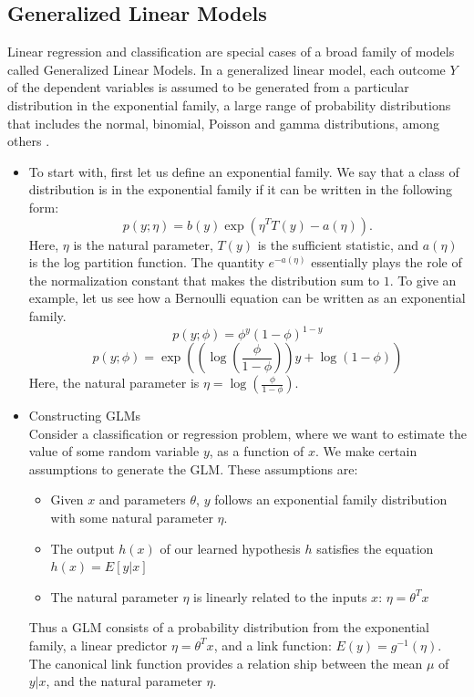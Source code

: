 \documentclass[twoside]{article}
\begin{document}
\subsection{Generalized Linear Models}
Linear regression and classification  are special cases of a broad family of models called Generalized Linear Models. In a generalized linear model, each outcome $Y$ of the dependent variables is assumed to be generated from a particular distribution in the exponential family, a large range of probability distributions that includes the normal, binomial, Poisson and gamma distributions, among others \cite{10.2307/2344614}.

\begin{itemize}
\item To start with, first let us define an exponential family. We say that a class of distribution is in the exponential family if it can be written in the following form:
\[p(y;\eta) = b(y) \exp(\eta^T T(y) - a(\eta)).\]
Here, $\eta$ is the natural parameter, $T(y)$ is the sufficient statistic, and $a(\eta)$ is the log partition function. The quantity $e^{-a(\eta)}$ essentially plays the role of the normalization constant that makes the distribution sum to $1$. To give an example, let us see how a Bernoulli equation can be written as an exponential family.
\[ p(y;\phi)  = \phi^y(1-\phi)^{1-y}\]
\[p(y;\phi)  = \exp \left(\left(\log \left(\frac{\phi}{1-\phi}\right)\right)y + \log(1-\phi) \right) \]
Here, the natural parameter is $\eta = \log \left(\frac{\phi}{1-\phi}\right)$.

\item Constructing GLMs \\
Consider a classification or regression problem, where we want to estimate the value of some random variable $y$, as a function of $x$. We make certain assumptions to generate the GLM. These assumptions are:
\begin{itemize}
\item  Given $x$ and parameters $\theta$, $y$ follows an exponential family distribution with some natural parameter $\eta$.
\item The output $h(x)$ of our learned hypothesis $h$ satisfies the equation $h(x) = E[y|x]$
\item The natural parameter $\eta$ is linearly related to the inputs $x$: $\eta = \theta^Tx$
\end{itemize}
Thus a GLM consists of a probability distribution from the exponential family, a linear predictor $\eta = \theta^Tx$, and a link function: $E(y) = g^{-1}(\eta)$. The canonical link function provides a relation ship between the mean $\mu$ of $y|x$, and the natural parameter $\eta$.

\end{itemize}
\end{document}
